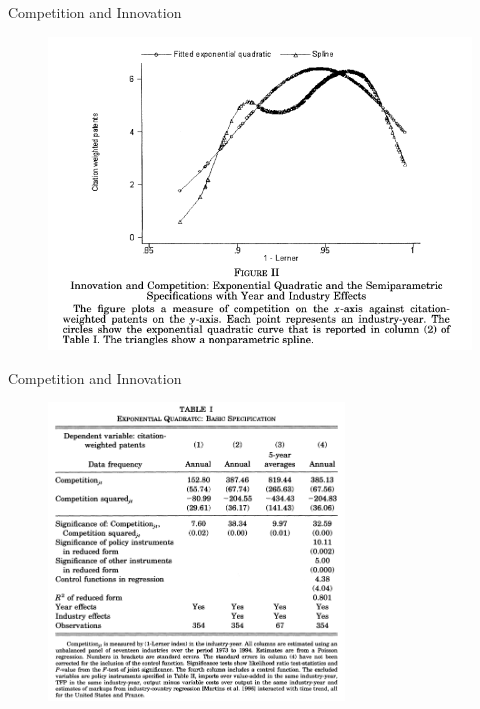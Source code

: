\documentclass{beamer}
\begin{document}
\begin{frame}{Competition and Innovation}{}
\begin{figure}[h]
\begin{centering}
  \includegraphics[width=\textwidth]{0202}
   \label{fig:0202}
\end{centering}
\end{figure}
\end{frame}

\begin{frame}{Competition and Innovation}{}
\begin{figure}[h]
\begin{centering}
  \includegraphics[width=0.7\textwidth]{0203}
   \label{fig:0203}
\end{centering}
\end{figure}
\end{frame}
\end{document}
